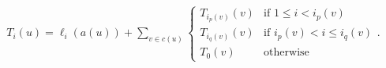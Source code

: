 \documentclass[a4paper,english,numberwithinsect]{eurocg18}
\newcommand{\maxsped}{\ensuremath{\textsc{MaxSPED}}\xspace}
\newcommand{\sollong}{\ensuremath{\textit{long}}\xspace}
\newcommand{\solmid}{\ensuremath{\textit{mid}}\xspace}
\newcommand{\solshort}{\ensuremath{\textit{short}}\xspace}
\begin{document}
\begin{align}
\label{rec:cactus_articulation}
T_i(u) = \ell_i(a(u)) + \sum_{v \in c(u)}
\begin{cases}
%
%
T_{i_p(v)}(v) & \text{if } 1 \le i < i_p(v)\\ %
T_{i_q(v)}(v) & \text{if } i_p(v) < i \leq i_q(v) \\
T_{0}(v) & \text{otherwise}
\end{cases}.
\end{align}
\end{document}
